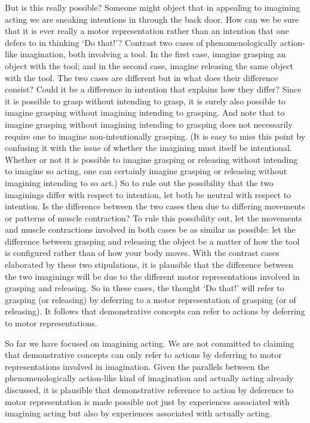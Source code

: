 \documentclass[12pt,\papersize]{extarticle}
\begin{document}
But is this really possible? Someone might object that in appealing to imagining acting we are sneaking intentions in through the back door. How can we be sure that it is ever really a motor representation rather than an intention that one defers to in thinking `Do that!'?  Contrast two cases of phenomenologically action-like imagination, both involving a tool. In the first case, imagine grasping an object with the tool; and in the second case, imagine releasing the same object with the tool. The two cases are different but in what does their difference consist? Could it be a difference in intention that explains how they differ?  Since it is possible to grasp without intending to grasp, it is surely also possible to imagine grasping without imagining intending to grasping.  And note that to imagine grasping without imagining intending to grasping does not necessarily require one to imagine non-intentionally grasping. (It is easy to miss this point by confusing it with the issue of whether the imagining must itself be intentional. Whether or not it is possible to imagine grasping or releasing without intending to imagine so acting, one can certainly imagine grasping or releasing without  imagining intending to so act.) So to rule out the possibility that the two imaginings differ with respect to intention, let both be neutral with respect to intention. Is the difference between the two cases then due to differing movements or patterns of muscle contraction? To rule this possibility out, let the movements and muscle contractions involved in both cases be as similar as possible: let the difference between grasping and releasing the object be a matter of how the tool is configured rather than of how your body moves. With the contrast cases elaborated by these two stipulations, it is plausible that the difference between the two imaginings will be due to the different motor representations involved in grasping and releasing. So in these cases, the thought `Do that!' will refer to grasping (or releasing) by deferring to a motor representation of grasping (or of releasing). It follows that demonstrative concepts can refer to actions by deferring to motor representations.

So far we have focused on imagining acting. We are not committed to claiming that demonstrative concepts can only refer to actions by deferring to motor representations involved in imagination. Given the parallels between the phenomenologically action-like kind of imagination and actually acting already discussed, it is plausible that demonstrative reference to action by deference to motor representation is made possible not just by experiences associated with imagining acting but also by experiences associated with actually acting.
\end{document}
